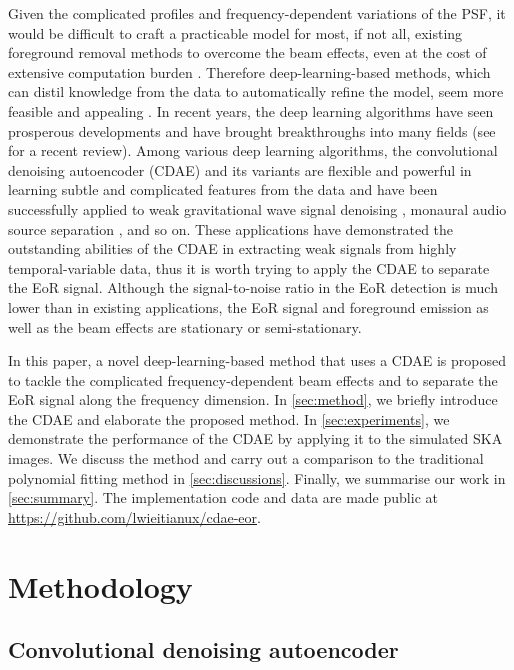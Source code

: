 \documentclass[letters,fleqn,usenatbib]{mnras}
\begin{document}
Given the complicated profiles and frequency-dependent variations of
the PSF, it would be difficult to craft a practicable model for most,
if not all, existing foreground removal methods to overcome the beam
effects, even at the cost of extensive computation burden
\citep[e.g.,][]{lochner2015}.
Therefore deep-learning-based methods, which can distil knowledge from
the data to automatically refine the model, seem more feasible
and appealing \citep[e.g.,][]{herbel2018,vafaeiSadr2018}.
In recent years, the deep learning algorithms have seen prosperous
developments and have brought breakthroughs into many fields
(see \citealt{lecun2015} for a recent review).
Among various deep learning algorithms, the convolutional denoising
autoencoder (CDAE) and its variants are flexible and powerful in
learning subtle and complicated features from the data and have been
successfully applied to
weak gravitational wave signal denoising \citep[e.g.,][]{shen2017},
monaural audio source separation \citep[e.g.,][]{grais2017}, and so on.
These applications have demonstrated the outstanding abilities of the
CDAE in extracting weak signals from highly temporal-variable data,
thus it is worth trying to apply the CDAE to separate the EoR signal.
Although the signal-to-noise ratio in the EoR detection is much lower
than in existing applications, the EoR signal and foreground emission
as well as the beam effects are stationary or semi-stationary.

In this paper, a novel deep-learning-based method that uses a CDAE
is proposed to tackle the complicated frequency-dependent beam effects
and to separate the EoR signal along the frequency dimension.
In \autoref{sec:method}, we briefly introduce the CDAE and elaborate
the proposed method.
In \autoref{sec:experiments}, we demonstrate the performance of the
CDAE by applying it to the simulated SKA images.
We discuss the method and carry out a comparison to the traditional
polynomial fitting method in \autoref{sec:discussions}.
Finally, we summarise our work in \autoref{sec:summary}.
The implementation code and data are made public at
\url{https://github.com/lwieitianux/cdae-eor}.


\section{Methodology}
\label{sec:method}

\subsection{Convolutional denoising autoencoder}
\label{sec:cdae}
\end{document}
